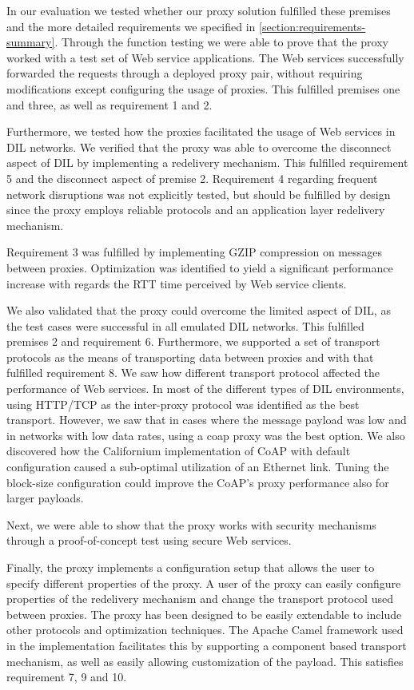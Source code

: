 In our evaluation we tested whether our proxy solution fulfilled these premises
and the more detailed requirements we specified in
\cref{section:requirements-summary}. Through the function testing we were able
to prove that the proxy worked with a test set of Web service applications. The
Web services successfully forwarded the requests through a deployed proxy pair,
without requiring modifications except configuring the usage of proxies. This
fulfilled premises one and three, as well as requirement 1 and 2.

Furthermore, we tested how the proxies facilitated the usage of Web services in
DIL networks. We verified that the proxy was able to overcome the disconnect
aspect of DIL by implementing a redelivery mechanism. This fulfilled requirement
5 and the disconnect aspect of premise 2. Requirement 4 regarding frequent
network disruptions was not explicitly tested, but should be fulfilled by design
since the proxy employs reliable protocols and an application layer redelivery
mechanism.

Requirement 3 was fulfilled by implementing GZIP compression on messages between
proxies. Optimization was identified to yield a significant performance increase with
regards the RTT time perceived by Web service clients.

We also validated that the proxy could overcome the limited aspect of DIL, as
the test cases were successful in all emulated DIL networks. This fulfilled
premises 2 and requirement 6. Furthermore, we supported a set of transport
protocols as the means of transporting data between proxies and with that
fulfilled requirement 8. We saw how different transport protocol affected the
performance of Web services. In most of the different types of DIL environments,
using HTTP/TCP as the inter-proxy protocol was identified as the best transport.
However, we saw that in cases where the message payload was low and in networks
with low data rates, using a \gls{coap} proxy was the best option. We also discovered
how the Californium implementation of CoAP with default configuration caused a
sub-optimal utilization of an Ethernet link. Tuning the block-size configuration
could improve the CoAP's proxy performance also for larger payloads.

Next, we were able to show that the proxy works with security mechanisms through
a proof-of-concept test using secure Web services.

Finally, the proxy implements a configuration setup that allows the user to
specify different properties of the proxy. A user of the proxy can easily
configure properties of the redelivery mechanism and change the transport
protocol used between proxies. The proxy has been designed to be easily
extendable to include other protocols and optimization techniques. The Apache
Camel framework used in the implementation facilitates this by supporting a
component based transport mechanism, as well as easily allowing customization of
the payload. This satisfies requirement 7, 9 and 10.


